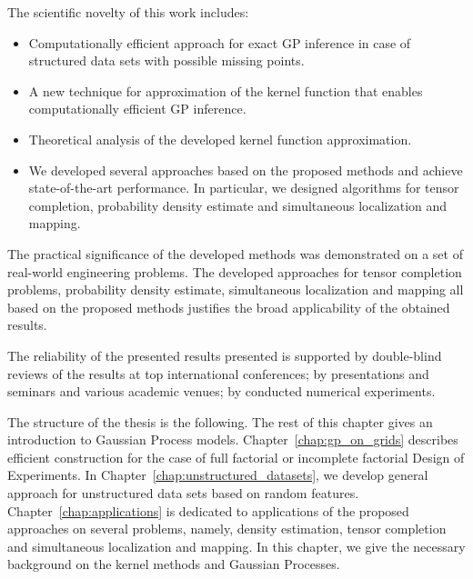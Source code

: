 The scientific novelty of this work includes:
\begin{itemize}
    \item Computationally efficient approach
    for exact GP inference in case of structured data sets with possible missing points.
    \item A new technique for approximation of the kernel function that enables
    computationally efficient GP inference.
    \item Theoretical analysis of the developed kernel function approximation.
    \item We developed several approaches based on the proposed methods
    and achieve state-of-the-art performance.
    In particular, we designed algorithms for tensor completion,
    probability density estimate and simultaneous localization and mapping.
\end{itemize}

The practical significance of the developed methods was demonstrated
on a set of real-world engineering problems.
The developed approaches for tensor completion problems,
probability density estimate, simultaneous localization and mapping
all based on the proposed methods justifies the broad applicability of the obtained results.

The reliability of the presented results presented is supported
by double-blind reviews of the results at top international conferences;
by presentations and seminars and various academic venues;
by conducted numerical experiments.

The structure of the thesis is the following.
The rest of this chapter gives an introduction to Gaussian Process models.
Chapter~\ref{chap:gp_on_grids} describes efficient construction for the
case of full factorial or incomplete factorial Design of Experiments.
In Chapter~\ref{chap:unstructured_datasets}, we develop general approach
for unstructured data sets based on random features.
Chapter~\ref{chap:applications} is dedicated to applications of the proposed
approaches on several problems, namely, density estimation, tensor completion
and simultaneous localization and mapping.
In this chapter, we give the necessary background on the kernel methods and Gaussian Processes.

